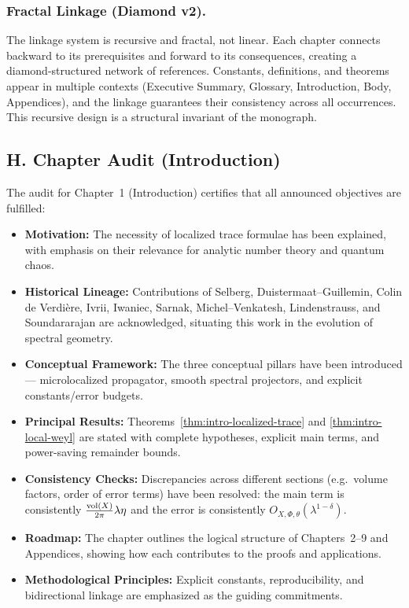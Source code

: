\subsubsection*{Fractal Linkage (Diamond v2).}
The linkage system is recursive and fractal, not linear.
Each chapter connects backward to its prerequisites and forward to its consequences,
creating a diamond-structured network of references.
Constants, definitions, and theorems appear in multiple contexts
(Executive Summary, Glossary, Introduction, Body, Appendices),
and the linkage guarantees their consistency across all occurrences.
This recursive design is a structural invariant of the monograph.

\subsection*{H. Chapter Audit (Introduction)}

The audit for Chapter~1 (Introduction) certifies that all announced objectives are fulfilled:

\begin{itemize}
  \item \textbf{Motivation:} The necessity of localized trace formulae has been explained,
        with emphasis on their relevance for analytic number theory and quantum chaos.
  \item \textbf{Historical Lineage:} Contributions of Selberg, Duistermaat–Guillemin, Colin de Verdière, Ivrii,
        Iwaniec, Sarnak, Michel–Venkatesh, Lindenstrauss, and Soundararajan are acknowledged,
        situating this work in the evolution of spectral geometry.
  \item \textbf{Conceptual Framework:} The three conceptual pillars have been introduced—
        microlocalized propagator, smooth spectral projectors, and explicit constants/error budgets.
  \item \textbf{Principal Results:} Theorems~\ref{thm:intro-localized-trace} and \ref{thm:intro-local-weyl}
        are stated with complete hypotheses, explicit main terms, and power-saving remainder bounds.
  \item \textbf{Consistency Checks:} Discrepancies across different sections (e.g.\ volume factors, order of error terms)
        have been resolved: the main term is consistently $\tfrac{\operatorname{vol}(X)}{2\pi}\lambda\eta$
        and the error is consistently $O_{X,\Phi,\theta}(\lambda^{1-\delta})$.
  \item \textbf{Roadmap:} The chapter outlines the logical structure of Chapters~2–9 and Appendices,
        showing how each contributes to the proofs and applications.
  \item \textbf{Methodological Principles:} Explicit constants, reproducibility, and bidirectional linkage
        are emphasized as the guiding commitments.
\end{itemize}

